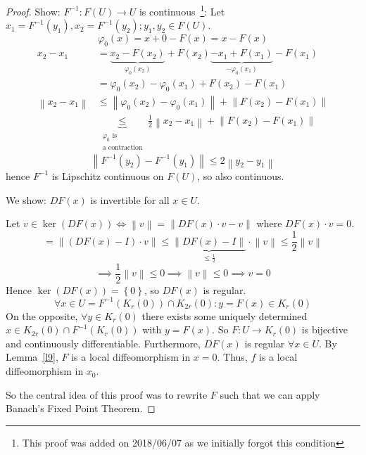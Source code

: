 \documentclass{article}
\newcommand{\set}[1]{\left\{#1\right\}}
\newcommand{\norm}[1]{\left\|#1\right\|}
\begin{document}
\begin{proof}
  Show: $F^{-1}: F(U) \to U$ is continuous~\footnote{This proof was added on 2018/06/07 as we initially forgot this condition}:
  Let $x_1 = F^{-1}(y_1), x_2 = F^{-1}(y_2); y_1, y_2 \in F(U)$.
  \[ \varphi_0(x) = x + 0 - F(x) = x - F(x) \]
  \begin{align*}
    x_2 - x_1 &= \underbrace{x_2 - F(x_2)}_{\varphi_0(x_2)} + F(x_2) \underbrace{- x_1 + F(x_1)}_{- \varphi_0(x_1)} - F(x_1) \\
      &= \varphi_0(x_2) - \varphi_0(x_1) + F(x_2) - F(x_1) \\
    \norm{x_2 - x_1} &\leq \norm{\varphi_0(x_2) - \varphi_0(x_1)} + \norm{F(x_2) - F(x_1)} \\
      &\underbrace{\leq}_{\substack{\varphi_0 \text{ is} \\ \text{a contraction}}} \frac12 \norm{x_2 - x_1} + \norm{F(x_2) - F(x_1)}
  \end{align*}
  \[ \norm{F^{-1}(y_2) - F^{-1}(y_1)} \leq 2 \norm{y_2 - y_1} \]
  hence $F^{-1}$ is Lipschitz continuous on $F(U)$, so also continuous.
  
  We show: $DF(x)$ is invertible for all $x \in U$.
  
  Let $v \in \ker(DF(x)) \iff \norm v = \norm{DF(x) \cdot v - v}$ where $DF(x) \cdot v = 0$.
  \[ = \norm{(DF(x) - I) \cdot v} \leq \underbrace{\norm{DF(x) - I}}_{\leq \frac12} \cdot \norm v \leq \frac12 \norm v \]
  \[ \implies \frac12 \norm v \leq 0 \implies \norm v \leq 0 \implies v = 0 \]
  Hence $\ker(DF(x)) = \set{0}$, so $DF(x)$ is regular.
  \[ \forall x \in U = F^{-1}(K_r(0)) \cap K_{2r}(0): y = F(x) \in K_r(0) \]
  On the opposite, $\forall y \in K_r(0)$ there exists some uniquely determined $x \in K_{2r}(0) \cap F^{-1}(K_r(0))$ with $y = F(x)$.
  So $F: U \to K_r(0)$ is bijective and continuously differentiable. Furthermore, $DF(x)$ is regular $\forall x \in U$.
  By Lemma~\ref{l9}, $F$ is a local diffeomorphism in $x = 0$.
  Thus, $f$ is a local diffeomorphism in $x_0$.
  
  So the central idea of this proof was to rewrite $F$ such that we can apply Banach's Fixed Point Theorem.
\end{proof}
\end{document}

